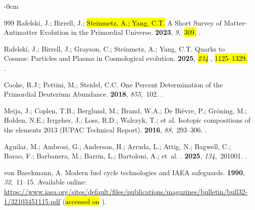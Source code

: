 \documentclass[particles,article,accept,pdftex,moreauthors]{Definitions/mdpi}
\begin{document}
\begin{adjustwidth}{-\extralength}{0cm}
\begin{thebibliography}{999}
Rafelski, J.; Birrell, J.;  \hl{Steinmetz, A.; Yang, C.T.} %
\newblock A Short Survey of Matter-Antimatter Evolution in the Primordial
  Universe.
 {\bf 2023}, {\em 9},~\hl{309.} %
.

Rafelski, J.; Birrell, J.;  Grayson, C.; Steinmetz, A.; Yang, C.T.
\newblock Quarks to Cosmos: Particles and Plasma in Cosmological evolution.
 {\bf 2025}, \emph{\hl{234}%
},  \hl{1125–1329.} 
.

Cooke, R.J.; Pettini, M.; Steidel, C.C.
\newblock One Percent Determination of the Primordial Deuterium Abundance.
 {\bf 2018}, {\em 855},~102.
.

Meija, J.; Coplen, T.B.; Berglund, M.; Brand, W.A.; De Bièvre, P.; Gröning, M.; Holden, N.E.; Irrgeher, J.; Loss, R.D.; Walczyk, T.; et al.
\newblock Isotopic compositions of the elements 2013 (IUPAC Technical Report).
 {\bf 2016}, {\em 88},~293--306.
.

Aguilar, M.;  Ambrosi, G.; Anderson, H.; Arruda, L.; Attig, N.; Bagwell, C.; Barao, F.; Barbanera, M.; Barrin, L.; Bartoloni, A.; et~al.
.
 {\bf 2025}, {\em 134},~201001.
.

von Baeckmann, A.
\newblock Modern fuel cycle technologies and IAEA safeguards.
 {\bf 1990}, {\em 32},~11--15.
\newblock
Available online:  \url{https://www.iaea.org/sites/default/files/publications/magazines/bulletin/bull32-1/32103451115.pdf} (\hl{accessed on}%
).


\end{thebibliography}
\end{adjustwidth}
\end{document}
